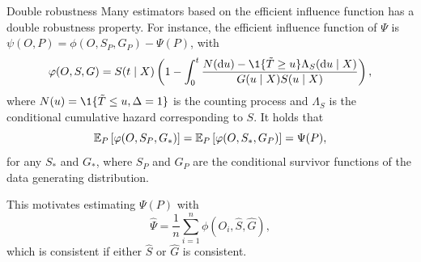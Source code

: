 \documentclass[smaller]{beamer}\usepackage{listings}
\begin{document}
\begin{frame}[label={sec:org5a76730}]{Double robustness}
\small Many estimators based on the efficient influence function has a double robustness property.
For instance, the efficient influence function of \(\Psi\) is \(\psi(O, P) = \phi(O, S_P, G_P) -
\Psi(P)\), with
\begin{equation*}
  \phi(O, S, G) = S(t \mid X)
  \left(
    1- \int_0^t \frac{N(\diff u) - \1{\{\tilde T \geq u\}} \Lambda_S(\diff u \mid X)}{G(u \mid X) S(u \mid X)}   
  \right),
\end{equation*}
where \(N(u) = \1{\{\tilde T \leq u, \Delta=1\}}\) is the counting process and $\Lambda_S$ is the
conditional cumulative hazard corresponding to \(S\). It holds that
\begin{equation*}
  \operatorname{\mathbb{E}}_P{\left[ \varphi(O, S_P, G_*) \right]}
  = \operatorname{\mathbb{E}}_P{\left[ \varphi(O, S_*, G_P) \right]}
  = \Psi(P),
\end{equation*}
for any \(S_*\) and \(G_*\), where \(S_P\) and \(G_P\) are the conditional survivor functions of the
data generating distribution.

\vfill

This motivates estimating $\Psi(P)$ with
\begin{equation*}
  \hat \Psi = \frac{1}{n}\sum_{i=1}^{n}\phi(O_i, \hat S, \hat G),
\end{equation*}
which is consistent if either \(\hat S\) or \(\hat G\) is consistent.
\end{frame}
\end{document}
